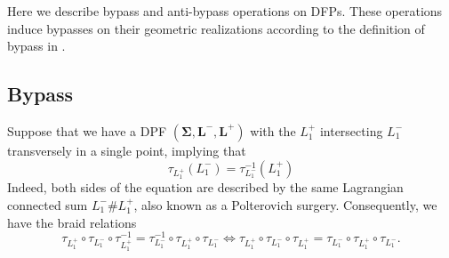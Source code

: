 \documentclass[11pt]{amsart}
\newcommand{\thicc}[1]{\pmb{#1}}
\newcommand{\LagTuple}{\thicc{L}}
\begin{document}
Here we describe bypass and anti-bypass operations on DFPs. These operations induce bypasses on their geometric realizations according to the definition of bypass in \cite{HH:Bypass}.

\subsection{Bypass}

Suppose that we have a DPF $(\thicc{\Sigma}, \LagTuple^{-}, \LagTuple^{+})$ with the $L^{+}_{1}$ intersecting $L^{-}_{1}$ transversely in a single point, implying that
\begin{equation}\label{Eq:SinglePointSwap}
\tau_{L^{+}_{1}}(L^{-}_{1}) = \tau_{L^{-}_{1}}^{-1}(L^{+}_{1})
\end{equation}
Indeed, both sides of the equation are described by the same Lagrangian connected sum $L^{-}_{1} \# L^{+}_{1}$, also known as a Polterovich surgery. Consequently, we have the braid relations
\begin{equation*}
\tau_{L^{+}_{1}} \circ \tau_{L_{1}^{-}} \circ \tau_{L^{+}_{1}}^{-1} = \tau_{L^{-}_{1}}^{-1}\circ \tau_{L_{1}^{+}}\circ \tau_{L^{-}_{1}} \iff \tau_{L^{+}_{1}}\circ \tau_{L_{1}^{-}} \circ \tau_{L^{+}_{1}} = \tau_{L^{-}_{1}} \circ \tau_{L_{1}^{+}} \circ \tau_{L^{-}_{1}}.
\end{equation*}
\end{document}
